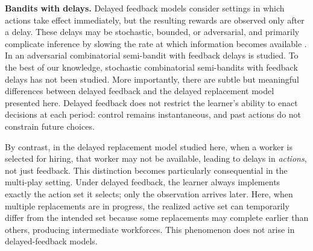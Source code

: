 \documentclass[opre,blindrev]{informs3}
\begin{document}

{\bf Bandits with delays.}
Delayed feedback models consider settings in which actions take effect immediately, but the resulting rewards are observed only after a delay. These delays may be stochastic, bounded, or adversarial, and primarily complicate inference by slowing the rate at which information becomes available \cite{joulani2013online}. In \cite{van2023unified} an adversarial combinatorial semi-bandit with feedback delays is studied. To the best of our knowledge, stochastic combinatorial semi-bandits with feedback delays has not been studied. More importantly, there are subtle but meaningful differences between delayed feedback and the delayed replacement model presented here. Delayed feedback does not restrict the learner’s ability to enact decisions at each period: control remains instantaneous, and past actions do not constrain future choices.

By contrast, in the delayed replacement model studied here, when a worker is selected for hiring, that worker may not be available, leading to delays in \emph{actions}, not just feedback. This distinction becomes particularly consequential in the multi-play setting. Under delayed feedback, the learner always implements exactly the action set it selects; only the observation arrives later. Here, when multiple replacements are in progress, the realized active set can temporarily differ from the intended set because some replacements may complete earlier than others, producing intermediate workforces. This phenomenon does not arise in delayed-feedback models.
\end{document}
